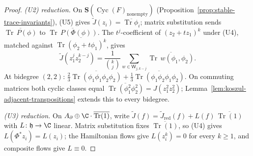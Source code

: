 \documentclass[11pt]{memoir}
\begin{document}
\begin{proof}
  \emph{(U2) reduction.}  On
  \(\mathbf S(\operatorname{Cyc}(F)_{\mathrm{nonempty}})\)
  (Proposition~\ref{prop:stable-trace-invariants}), (U5) gives
  \(\widetilde J(z_i)=\overline{\operatorname{Tr}\phi_i}\); matrix
  substitution sends \(\overline{\operatorname{Tr}\,P(\phi)}\) to
  \(\overline{\operatorname{Tr}\,P(\Phi(\phi))}\).  The
  \(t^j\)-coefficient of \((z_2+tz_1)^k\) under (U4), matched against
  \(\overline{\operatorname{Tr}(\phi_2+t\phi_1)^k}\), gives
  \[
    \widetilde J(z_1^jz_2^{k-j})
     =\frac{1}{\binom{k}{j}}
      \sum_{w\in\mathsf W_{j,k-j}}
      \overline{\operatorname{Tr}\,w(\phi_1,\phi_2)}.
  \]
  At bidegree \((2,2)\):
  \(\tfrac{2}{3}\overline{\operatorname{Tr}(\phi_1\phi_1\phi_2\phi_2)}
   +\tfrac{1}{3}\overline{\operatorname{Tr}(\phi_1\phi_2\phi_1\phi_2)}\).
  On commuting matrices both cyclic classes equal
  \(\overline{\operatorname{Tr}(\phi_1^2\phi_2^2)}=J(z_1^2z_2^2)\);
  Lemma~\ref{lem:koszul-adjacent-transpositions} extends this to every bidegree.

  \emph{(U3) reduction.}  On
  \(A_\partial\oplus\C\cdot\overline{\operatorname{Tr}(1)}\), write
  \(\widetilde J(f)=\widetilde J_{\mathrm{red}}(f)+L(f)\,
   \overline{\operatorname{Tr}(1)}\) with \(L\colon\mathfrak h\to\C\)
  linear.  Matrix substitution fixes
  \(\overline{\operatorname{Tr}(1)}\), so (U4) gives
  \(L(\Phi^*z_i)=L(z_i)\); the Hamiltonian flows give
  \(L(z_i^k)=0\) for every \(k\ge1\), and composite flows give
  \(L\equiv0\).
\end{proof}
\end{document}
